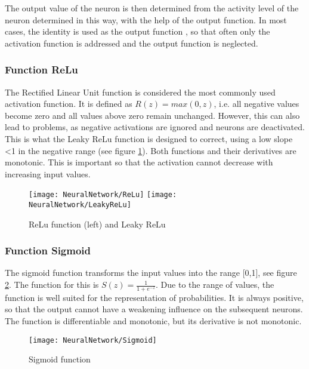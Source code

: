 The output value of the neuron is then determined from the activity level of the neuron determined in this way, with the help of the output function. In most cases, the identity is used as the output function \cite{Beck:2018}, so that often only the activation function is addressed and the output function is neglected.

\subsubsection{Function ReLu}

The Rectified Linear Unit function is considered the most commonly used activation function. It is defined as $R(z)=max(0,z)$, i.e. all negative values become zero and all values above zero remain unchanged. However, this can also lead to problems, as negative activations are ignored and neurons are deactivated. This is what the Leaky ReLu function is designed to correct, using a low slope <1 in the negative range (see figure \ref{ReLu}). Both functions and their derivatives are monotonic. This is important so that the activation cannot decrease with increasing input values. \cite{Gupta:2020b,Sharma:2018b}

\begin{figure}[H]
	\begin{center}
		\texttt{[image: NeuralNetwork/ReLu]}
		\texttt{[image: NeuralNetwork/LeakyReLu]}
		\caption{ReLu function (left) and Leaky ReLu} 
		\label{ReLu}
	\end{center}
\end{figure}

\subsubsection{Function Sigmoid} 

The sigmoid function transforms the input values into the range [0,1], see figure \ref{Sigmoid}. The function for this is $S(z)=\frac{1}{1+e^{-z}}$. Due to the range of values, the function is well suited for the representation of probabilities. It is always positive, so that the output cannot have a weakening influence on the subsequent neurons. The function is differentiable and monotonic, but its derivative is not monotonic. \cite{Gupta:2020b,Sharma:2018b}

\begin{figure}[H]
	\begin{center}
		\texttt{[image: NeuralNetwork/Sigmoid]}
		\caption{Sigmoid function} 
		\label{Sigmoid}
	\end{center}
\end{figure}

